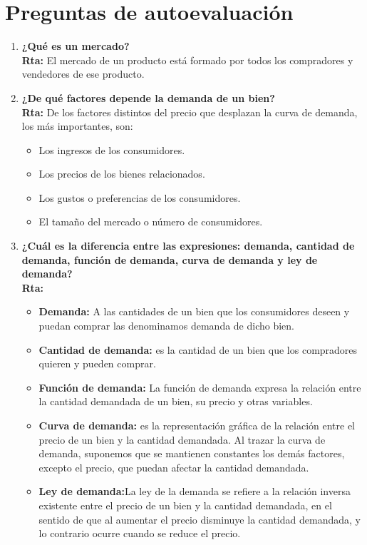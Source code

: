 \documentclass[12pt]{book}
\begin{document}
\section{Preguntas de autoevaluaci\'on}
\begin{enumerate}

\item \textbf{¿Qué es un mercado?}
\\
\textbf{Rta:} El mercado de un producto está formado por todos los compradores y vendedores de ese producto.

\item \textbf{¿De qué factores depende la demanda de un bien?}
\\
\textbf{Rta:}
De los factores distintos del precio que desplazan la curva de demanda, los más importantes, son:
\begin{itemize}
\item Los ingresos de los consumidores.
\item Los precios de los bienes relacionados.
\item Los gustos o preferencias de los consumidores.
\item El tamaño del mercado o número de consumidores.
\end{itemize}


\item \textbf{¿Cuál es la diferencia entre las expresiones: demanda, cantidad de demanda, función de demanda, curva de demanda y ley de demanda?}
\\
\textbf{Rta:}
\begin{itemize}
\item \textbf{Demanda: }A las cantidades de un bien que los consumidores deseen y puedan comprar las denominamos demanda de dicho bien.
\item \textbf{Cantidad de demanda: }es la cantidad de un bien que los compradores quieren y pueden comprar.
\item \textbf{Función de demanda: }La función de demanda expresa la relación entre la cantidad demandada de un bien, su precio
y otras variables.
\item \textbf{Curva de demanda: }es la representación gráfica de la relación entre el precio de un bien y la cantidad demandada. Al trazar la curva de demanda, suponemos que se mantienen constantes los demás factores, excepto el precio, que puedan afectar la cantidad demandada.
\item \textbf{Ley de demanda:}La ley de la demanda se refiere a la relación inversa existente entre el precio de un bien y
la cantidad demandada, en el sentido de que al aumentar el precio disminuye la cantidad demandada, y lo contrario ocurre cuando se reduce el precio.
\end{itemize}


\end{enumerate}
\end{document}
